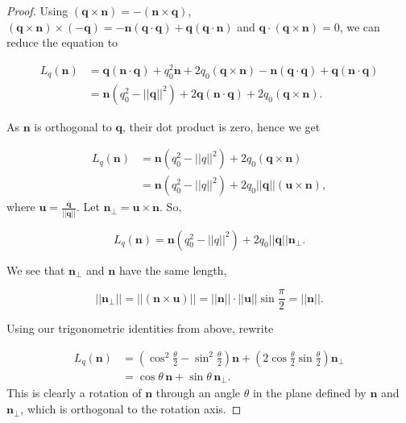 \documentclass[a4paper, 11pt]{article}
\begin{document}
\begin{proof}
Using $(\boldsymbol{q}\times\boldsymbol{n}) = -(\boldsymbol{n} \times \boldsymbol{q})$, $(\boldsymbol{q} \times \boldsymbol{n}) \times (-\boldsymbol{q}) = -\boldsymbol{n}(\boldsymbol{q}\cdot \boldsymbol{q}) + \boldsymbol{q}(\boldsymbol{q}\cdot \boldsymbol{n})$ and $\boldsymbol{q}\cdot(\boldsymbol{q} \times \boldsymbol{n}) = 0$, we can reduce the equation to

\[\begin{aligned}
L_q(\boldsymbol{n})&= \boldsymbol{q}(\boldsymbol{n} \cdot \boldsymbol{q}) + q_0^2\boldsymbol{n} +2q_0(\boldsymbol{q} \times\boldsymbol{n}) -\boldsymbol{n}(\boldsymbol{q} \cdot \boldsymbol{q}) + \boldsymbol{q}(\boldsymbol{n} \cdot \boldsymbol{q})\\
&=\boldsymbol{n}(q_0^2-||\boldsymbol{q}||^2) + 2\boldsymbol{q}(\boldsymbol{n} \cdot \boldsymbol{q}) + 2q_0(\boldsymbol{q}\times\boldsymbol{n}).
\end{aligned}
\]

As $\boldsymbol{n}$ is orthogonal to $\boldsymbol{q}$, their dot product is zero, hence we get

\[\begin{aligned}
L_q(\boldsymbol{n}) &= \boldsymbol{n}(q_0^2-||q||^2)+2q_0(\boldsymbol{q}\times \boldsymbol{n})\\
&=\boldsymbol{n}(q_0^2-||q||^2) + 2q_0||\boldsymbol{q}||(\boldsymbol{u}\times\boldsymbol{n}),
\end{aligned}
\]
where $\boldsymbol{u} = \frac{\boldsymbol{q}}{||\boldsymbol{q}||}$. Let $\boldsymbol{n}_\perp = \boldsymbol{u} \times \boldsymbol{n}$. So,

\[L_q(\boldsymbol{n}) = \boldsymbol{n}(q_0^2-||q||^2)+2q_0||\boldsymbol{q}||\boldsymbol{n}_\perp.\]

We see that $\boldsymbol{n}_\perp$ and $\boldsymbol{n}$ have the same length,

\[||\boldsymbol{n}_\perp|| = ||(\boldsymbol{n} \times \boldsymbol{u})|| = ||\boldsymbol{n}|| \cdot ||\boldsymbol{u}|| \sin \frac{\pi}{2} = ||\boldsymbol{n}||.\]

Using our trigonometric identities from above, rewrite

\[
\begin{aligned}
L_q(\boldsymbol{n})
&=
\left(\cos^2 \frac{\theta}{2} - \sin^2 \frac{\theta}{2}\right)\boldsymbol{n}
+
\left(2\cos \frac{\theta}{2}\sin \frac{\theta}{2}\right)\boldsymbol{n}_{\perp} \\
&= \cos\theta\,\boldsymbol{n} + \sin\theta\,\boldsymbol{n}_{\perp}.
\end{aligned}
\]
This is clearly a rotation of $\boldsymbol{n}$ through an angle $\theta$ in the plane defined by $\boldsymbol{n}$ and $\boldsymbol{n}_\perp$, which is orthogonal to the rotation axis.


\end{proof}
\end{document}
